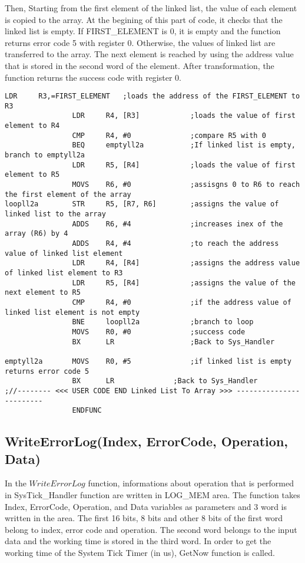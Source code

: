 \documentclass[pdftex,12pt,a4paper]{article}
\begin{document}
Then, Starting from the first element of the linked list, the value of each element is copied to the array. At the begining of this part of code, it checks that the linked list is empty. If FIRST\_ELEMENT is 0, it is empty and the function returns error code 5 with register 0. Otherwise, the values of linked list are transferred to the array. The next element is reached by using the address value that is stored in the second word of the element. After transformation, the function returns the success code with register 0.

\newpage
\begin{lstlisting}[caption=Transforming the linked list to the array, style=customasm]
				LDR 	R3,=FIRST_ELEMENT	;loads the address of the FIRST_ELEMENT to R3
				LDR		R4, [R3]			;loads the value of first element to R4
				CMP		R4, #0				;compare R5 with 0
				BEQ		emptyll2a			;If linked list is empty, branch to emptyll2a
				LDR		R5, [R4]			;loads the value of first element to R5
				MOVS	R6, #0				;assisgns 0 to R6 to reach the first element of the array
loopll2a		STR		R5, [R7, R6]		;assigns the value of linked list to the array
				ADDS	R6, #4				;increases inex of the array (R6) by 4
				ADDS	R4, #4				;to reach the address value of linked list element
				LDR		R4, [R4]			;assigns the address value of linked list element to R3
				LDR		R5, [R4]			;assigns the value of the next element to R5
				CMP		R4, #0				;if the address value of linked list element is not empty
				BNE		loopll2a			;branch to loop
				MOVS	R0, #0				;success code
				BX		LR					;Back to Sys_Handler
				
emptyll2a		MOVS	R0, #5				;if linked list is empty returns error code 5	
				BX		LR				;Back to Sys_Handler
;//-------- <<< USER CODE END Linked List To Array >>> ------------------------				
				ENDFUNC
\end{lstlisting}
\newpage
\subsection{WriteErrorLog(Index, ErrorCode, Operation, Data)}

In the $WriteErrorLog$ function, informations about operation that is performed in SysTick\_Handler function are written in LOG\_MEM area. The function takes Index, ErrorCode, Operation, and Data variables as parameters and 3 word is written in the area. The first 16 bits, 8 bits and other 8 bits of the first word belong to index, error code and operation. The second word belongs to the input data and the working time is stored in the third word. In order to get the working time of the System Tick Timer (in us), GetNow function is called. 
\end{document}

